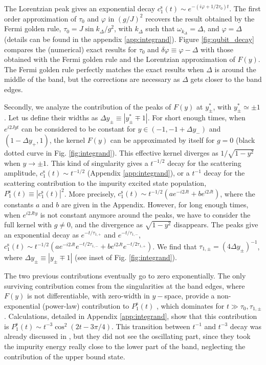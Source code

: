 \documentclass[aps,pra,twocolumn,floatfix,superscriptaddress]{revtex4-1}%
\begin{document}
The Lorentzian peak gives an exponential decay $c_1^\text{s}(t)\sim e^{-(i\varphi+1/2\tau_0)t}$. 
The first order approximation of $\tau_0$ and $\varphi$ in $(g/J)^2$ recovers the result obtained by the Fermi golden rule, $\tau_0=J\sin k_\Delta/g^2$, with $k_\Delta$ such that $\omega_{k_\Delta}=\Delta$, and $\varphi=\Delta$ (details can be found in the appendix \ref{app:integrand}). 
Figure \ref{fig:qubit_decay} compares the (numerical) exact results for $\tau_0$ and $\delta\varphi\equiv\varphi-\Delta$ with those obtained with the Fermi golden rule and the Lorentzian approximation of $F(y)$. The Fermi golden rule perfectly matches the exact results when $\Delta$ is around the middle of the band, but {\color{blue}the corrections are} necessary as $\Delta$ gets closer to the band edges. %

Secondly, we analyze the contribution of the peaks of $F(y)$ at $y_\pm^*$, with $y_\pm^*\simeq \pm 1$. Let us define their widths as $\Delta y_\pm\equiv |y_\pm^* \mp 1|$. For short enough times, when $e^{i2Jyt}$ can be considered to be constant for $y\in (-1,-1+\Delta y_-)$ and $(1-\Delta y_+,1)$, the kernel $F(y)$ can be approximated by itself for $g=0$ (black dotted curve in Fig. \ref{fig:integrand}). This effective kernel diverges as $1/\sqrt{1-y^2}$ when $y\to\pm 1$. This kind of singularity gives a $t^{-1/2}$ decay for the scattering amplitude, $c_1^\text{s}(t)\sim t^{-1/2}$ (Appendix \ref{app:integrand}), or a $t^{-1}$ decay for the scattering contribution to the impurity excited state population, $P_1^\text{s}(t)\equiv |c_1^\text{s}(t)|^2$. More precisely, $c_1^\text{s}(t)\sim t^{-1/2}(a e^{-i2Jt} + b e^{i2Jt})$, where the constants $a$ and $b$ are given in the Appendix. However, for long enough times, when $e^{i2Jty}$ is not constant anymore around the peaks, we have to consider the full kernel with $g\neq 0$, and the divergence as $\sqrt{1-y^2}$ disappears. The peaks give an exponential decay as $e^{-t/\tau_{1,+}}$ and $e^{-t/\tau_{1,-}}$, $c_1^\text{s}(t)\sim t^{-1/2}(a e^{-i2Jt}e^{-t/2\tau_{1,-}} + b e^{i2Jt}e^{-t/2\tau_{1,+}})$. We find that $\tau_{1,\pm} = (4 \Delta y_\pm)^{-1}$, where $\Delta y_\pm\equiv |y_\pm \mp 1|$ (see inset of Fig. \ref{fig:integrand}).

The two previous contributions eventually go to zero exponentially. The only surviving contribution comes from the singularities at the band edges, where $F(y)$ is not differentiable, with zero-width in $y-$space, provide a non-exponential (power-law) contribution to  $P_1^\text{s}(t) $ \cite{Khalfin1958,Fonda1978,Hack1982,Gaveau1995}, which dominates for  $t\gg \tau_0,\tau_{1,\pm}$. Calculations, detailed in Appendix \ref{app:integrand}, show that this contribution is $P_1^\text{s}(t) \sim t ^{-3} \cos^2(2t-3\pi/4)$. This transition between $t^{-1}$ and $t^{-3}$ decay was already discussed in \cite{Garmon2013}, but they did not see the oscillating part, since they took the impurity energy really close to the lower part of the band, neglecting the contribution of the upper bound state.
\end{document}
